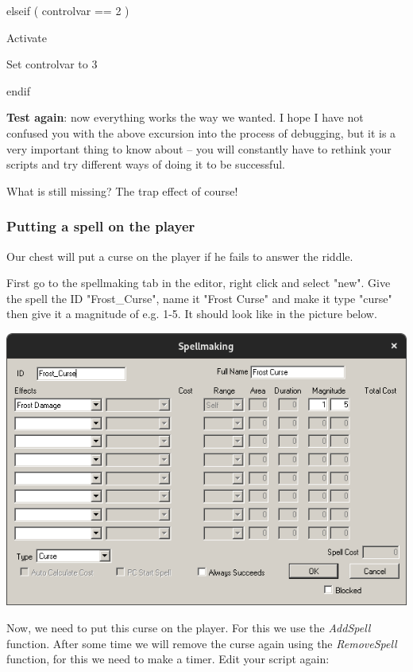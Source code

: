 
elseif ( controlvar == 2 )

Activate

Set controlvar to 3

endif

\textbf{Test again}: now everything works the way we wanted. I hope I have not confused you with the above excursion into the process of debugging, but it is a very important thing to know about -- you will constantly have to rethink your scripts and try different ways of doing it to be successful.

What is still missing? The trap effect of course!

\hypertarget{putting-a-spell-on-the-player}{%
\subsubsection{Putting a spell on the player}\label{putting-a-spell-on-the-player}}

Our chest will put a curse on the player if he fails to answer the riddle.

First go to the spellmaking tab in the editor, right click and select "new". Give the spell the ID "Frost\_Curse", name it "Frost Curse" and make it type "curse" then give it a magnitude of e.g. 1-5. It should look like in the picture below.

\includegraphics{media/frost-curse.png}

Now, we need to put this curse on the player. For this we use the \emph{AddSpell} function. After some time we will remove the curse again using the \emph{RemoveSpell} function, for this we need to make a timer. Edit your script again:

